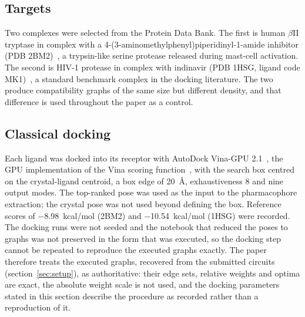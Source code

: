\documentclass{iopjournal}
\begin{document}
\subsection{Targets}
\label{sec:targets}
Two complexes were selected from the Protein Data Bank. The first is human $\beta$II tryptase in complex with a 4-(3-aminomethylphenyl)piperidinyl-1-amide inhibitor (PDB 2BM2)~\cite{levell2005tryptase}, a trypsin-like serine protease released during mast-cell activation. The second is HIV-1 protease in complex with indinavir (PDB 1HSG, ligand code MK1)~\cite{chen1994hsg}, a standard benchmark complex in the docking literature. The two produce compatibility graphs of the same size but different density, and that difference is used throughout the paper as a control.

\subsection{Classical docking}
\label{sec:vina}
Each ligand was docked into its receptor with AutoDock Vina-GPU 2.1~\cite{tang2024vinagpu21}, the GPU implementation of the Vina scoring function~\cite{trott2010vina}, with the search box centred on the crystal-ligand centroid, a box edge of \SI{20}{\angstrom}, exhaustiveness 8 and nine output modes. The top-ranked pose was used as the input to the pharmacophore extraction; the crystal pose was not used beyond defining the box. Reference scores of \SI{-8.98}{kcal/mol} (2BM2) and \SI{-10.54}{kcal/mol} (1HSG) were recorded. The docking runs were not seeded and the notebook that reduced the poses to graphs was not preserved in the form that was executed, so the docking step cannot be repeated to reproduce the executed graphs exactly. The paper therefore treats the executed graphs, recovered from the submitted circuits (section~\ref{sec:setup}), as authoritative: their edge sets, relative weights and optima are exact, the absolute weight scale is not used, and the docking parameters stated in this section describe the procedure as recorded rather than a reproduction of it.
\end{document}
